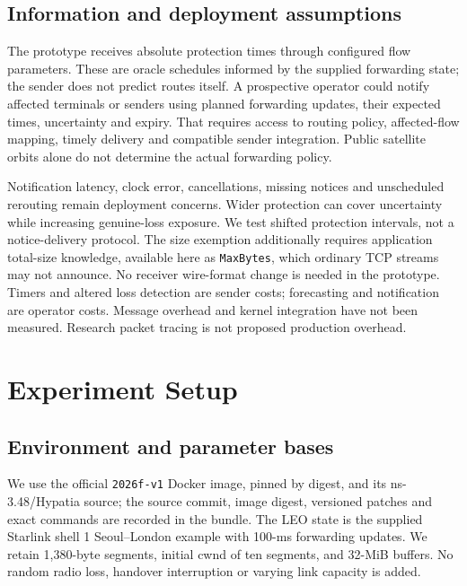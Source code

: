 \documentclass[conference]{IEEEtran}
\begin{document}
\subsection{Information and deployment assumptions}
The prototype receives absolute protection times through configured
flow parameters. These are oracle schedules informed by the supplied
forwarding state; the sender does not predict routes itself. A prospective
operator could notify affected terminals or senders using planned
forwarding updates, their expected times, uncertainty and expiry.
That requires access to routing policy, affected-flow mapping, timely
delivery and compatible sender integration. Public satellite orbits
alone do not determine the actual forwarding policy.

Notification latency, clock error, cancellations, missing notices and
unscheduled rerouting remain deployment concerns. Wider protection can
cover uncertainty while increasing genuine-loss exposure. We test
shifted protection intervals, not a notice-delivery protocol. The
size exemption additionally requires application total-size knowledge,
available here as \texttt{MaxBytes}, which ordinary TCP streams may not
announce. No receiver wire-format change is needed in the prototype.
Timers and altered loss detection are sender costs; forecasting and
notification are operator costs. Message overhead and kernel integration
have not been measured. Research packet tracing is not proposed
production overhead.

\section{Experiment Setup}
\subsection{Environment and parameter bases}
We use the official \texttt{2026f-v1} Docker image, pinned by digest,
and its ns-3.48/Hypatia source; the source commit, image digest,
versioned patches and exact commands are recorded in the bundle.
The LEO state is the supplied Starlink shell 1 Seoul--London example
with 100-ms forwarding updates. We retain 1,380-byte segments,
initial cwnd of ten segments, and 32-MiB buffers. No random radio loss,
handover interruption or varying link capacity is added.
\end{document}
